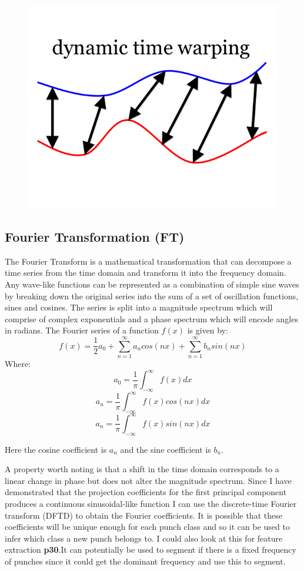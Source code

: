 \begin{figure}[h]
    \centering
    \includegraphics[height=0.25\textheight]{fig02/dtw}
    \label{fig:kinect}
\end{figure}


\subsection{Fourier Transformation (FT)}
The Fourier Transform is a mathematical transformation that can decompose a time series from the time domain and transform it into the frequency domain. Any wave-like functions can be represented as a combination of simple sine waves by breaking down the original series into the sum of a set of oscillation functions, sines and cosines. The series is split into a magnitude spectrum which will comprise of complex exponentials and a phase spectrum which will encode angles in radians. 
The Fourier series of a function $f(x)$ is given by:
$$f(x)=\frac{1}{2}a_0 + \sum_{n=1}^\infty a_n cos(nx) + \sum_{n=1}^\infty b_n sin(nx)$$
Where:
$$a_0 = \frac{1}{\pi}\int_{-\infty}^\infty f(x)dx$$
$$a_n = \frac{1}{\pi}\int_{-\infty}^\infty f(x)cos(nx)dx$$
$$a_n = \frac{1}{\pi}\int_{-\infty}^\infty f(x)sin(nx)dx$$

Here the cosine coefficient is $a_n$ and the sine coefficient is $b_n$.

A property worth noting is that a shift in the time domain corresponds to a linear change in phase but does not alter the magnitude spectrum. Since I have demonstrated that the projection coefficients for the first principal component produces a continuous sinusoidal-like function I can use the discrete-time Fourier transform (DFTD) to obtain the Fourier coefficients. It is possible that these coefficients will be unique enough for each punch class and so it can be used to infer which class a new punch belongs to. I could also look at this for feature extraction {\bf p30}.It can potentially be used to segment if there is a fixed frequency of punches since it could get the dominant frequency and use this to segment.

